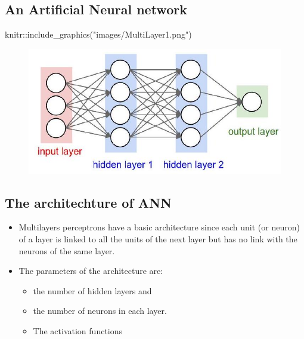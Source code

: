 \documentclass[
  letterpaper,
  DIV=11,
  numbers=noendperiod]{scrartcl}
\newenvironment{Shaded}{\begin{snugshade}}{\end{snugshade}}
\newcommand{\FunctionTok}[1]{\textcolor[rgb]{0.28,0.35,0.67}{#1}}
\newcommand{\NormalTok}[1]{\textcolor[rgb]{0.00,0.23,0.31}{#1}}
\newcommand{\SpecialCharTok}[1]{\textcolor[rgb]{0.37,0.37,0.37}{#1}}
\newcommand{\StringTok}[1]{\textcolor[rgb]{0.13,0.47,0.30}{#1}}
\providecommand{\tightlist}{%
  \setlength{\itemsep}{0pt}\setlength{\parskip}{0pt}}\usepackage{longtable,booktabs,array}
\begin{document}
\hypertarget{an-artificial-neural-network}{%
\subsection{An Artificial Neural
network}\label{an-artificial-neural-network}}

\begin{Shaded}
\begin{Highlighting}[]
\NormalTok{knitr}\SpecialCharTok{::}\FunctionTok{include\_graphics}\NormalTok{(}\StringTok{"images/MultiLayer1.png"}\NormalTok{)}
\end{Highlighting}
\end{Shaded}

\begin{figure}[H]

{\centering \includegraphics[width=1\textwidth,height=\textheight]{images/MultiLayer1.png}

}

\end{figure}

\hypertarget{the-architechture-of-ann}{%
\subsection{The architechture of ANN}\label{the-architechture-of-ann}}

\begin{itemize}
\item
  Multilayers perceptrons have a basic architecture since each unit (or
  neuron) of a layer is linked to all the units of the next layer but
  has no link with the neurons of the same layer.
\item
  The parameters of the architecture are:

  \begin{itemize}
  \tightlist
  \item
    the number of hidden layers and
  \item
    the number of neurons in each layer.
  \item
    The activation functions
  \end{itemize}
\end{itemize}
\end{document}

